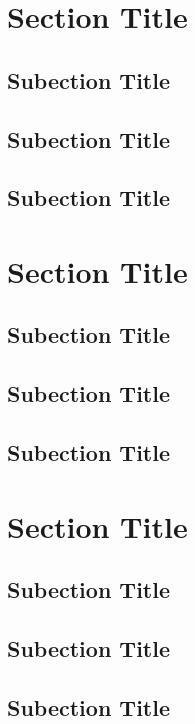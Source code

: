 \section{Section Title}

\subsection{Subection Title}
\subsection{Subection Title}
\subsection{Subection Title}

\newpage

\section{Section Title}
\subsection{Subection Title}
\subsection{Subection Title}
\subsection{Subection Title}

\newpage

\section{Section Title}
\subsection{Subection Title}
\subsection{Subection Title}
\subsection{Subection Title}
